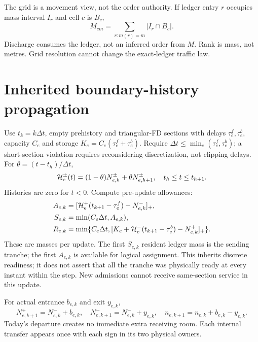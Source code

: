 \documentclass[10pt,a4paper]{article}
\newcommand{\pos}[1]{[#1]_+}
\begin{document}
The grid is a movement view, not the order authority. If ledger entry $r$
occupies mass interval $I_r$ and cell $c$ is $B_c$,
\begin{equation}
 M_{cm}=\sum_{r:m(r)=m}|I_r\cap B_c|.
 \label{eq:grid-new}
\end{equation}
Discharge consumes the ledger, not an inferred order from $M$. Rank is mass,
not metres. Grid resolution cannot change the exact-ledger traffic law.

\section{Inherited boundary-history propagation}

Use $t_k=k\Delta t$, empty prehistory and triangular-FD sections with
delays $\tau^f_e,\tau^b_e$, capacity $C_e$ and storage
$K_e=C_e(\tau^f_e+\tau^b_e)$. Require
$\Delta t\leq\min_e(\tau^f_e,\tau^b_e)$; a short-section violation requires
reconsidering discretization, not clipping delays.
For $\theta=(t-t_h)/\Delta t$,
\begin{equation}
 {\cal H}^{\pm}_e(t)=(1-\theta)N^\pm_{e,h}+\theta N^\pm_{e,h+1},
 \quad t_h\leq t\leq t_{h+1}.
 \label{eq:interpolation-new}
\end{equation}
Histories are zero for $t<0$. Compute pre-update allowances:
\begin{align}
 A_{e,k}&=\pos{{\cal H}^+_e(t_{k+1}-\tau^f_e)-N^-_{e,k}},\nonumber\\
 S_{e,k}&=\min(C_e\Delta t,A_{e,k}),\label{eq:sending-new}\\
 R_{e,k}&=\min\{C_e\Delta t,
 \pos{K_e+{\cal H}^-_e(t_{k+1}-\tau^b_e)-N^+_{e,k}}\}.
 \label{eq:receiving-new}
\end{align}
These are masses per update. The first $S_{e,k}$ resident ledger mass is the
sending tranche; the first $A_{e,k}$ is available for logical assignment.
This inherits discrete readiness; it does not assert that all the tranche
was physically ready at every instant within the step. New admissions
cannot receive same-section service in this update.

For actual entrance $b_{e,k}$ and exit $y_{e,k}$,
\begin{equation}
 N^+_{e,k+1}=N^+_{e,k}+b_{e,k},\quad
 N^-_{e,k+1}=N^-_{e,k}+y_{e,k},\quad
 n_{e,k+1}=n_{e,k}+b_{e,k}-y_{e,k}.
 \label{eq:state-new}
\end{equation}
Today's departure creates no immediate extra receiving room. Each internal
transfer appears once with each sign in its two physical owners.
\end{document}
